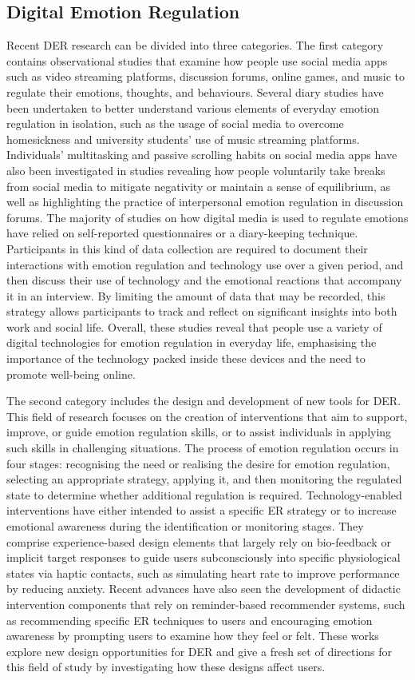 \documentclass[acmtog]{acmart}
\begin{document}
\subsection{Digital Emotion Regulation}
Recent DER research can be divided into three categories. The first category contains observational studies that examine how people use social media apps such as video streaming platforms, discussion forums, online games, and music to regulate their emotions, thoughts, and behaviours. Several diary studies have been undertaken to better understand various elements of everyday emotion regulation in isolation, such as the usage of social media to overcome homesickness and university students' use of music streaming platforms. Individuals' multitasking and passive scrolling habits on social media apps have also been investigated in studies revealing how people voluntarily take breaks from social media to mitigate negativity or maintain a sense of equilibrium, as well as highlighting the practice of interpersonal emotion regulation in discussion forums. The majority of studies on how digital media is used to regulate emotions have relied on self-reported questionnaires or a diary-keeping technique. Participants in this kind of data collection are required to document their interactions with emotion regulation and technology use over a given period, and then discuss their use of technology and the emotional reactions that accompany it in an interview. By limiting the amount of data that may be recorded, this strategy allows participants to track and reflect on significant insights into both work and social life. Overall, these studies reveal that people use a variety of digital technologies for emotion regulation in everyday life, emphasising the importance of the technology packed inside these devices and the need to promote well-being online.

The second category includes the design and development of new tools for DER. This field of research focuses on the creation of interventions that aim to support, improve, or guide emotion regulation skills, or to assist individuals in applying such skills in challenging situations. The process of emotion regulation occurs in four stages: recognising the need or realising the desire for emotion regulation, selecting an appropriate strategy, applying it, and then monitoring the regulated state to determine whether additional regulation is required. Technology-enabled interventions have either intended to assist a specific ER strategy or to increase emotional awareness during the identification or monitoring stages. They comprise experience-based design elements that largely rely on bio-feedback or implicit target responses to guide users subconsciously into specific physiological states via haptic contacts, such as simulating heart rate to improve performance by reducing anxiety. Recent advances have also seen the development of didactic intervention components that rely on reminder-based recommender systems, such as recommending specific ER techniques to users and encouraging emotion awareness by prompting users to examine how they feel or felt. These works explore new design opportunities for DER and give a fresh set of directions for this field of study by investigating how these designs affect users.
\end{document}
